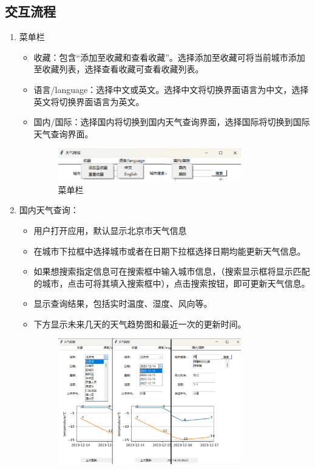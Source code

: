 \documentclass[UTF8]{ctexart}
\begin{document}
\subsection{交互流程}
\begin{enumerate}
   \item 菜单栏
   \begin{itemize}
      \item 收藏：包含“添加至收藏和查看收藏”。选择添加至收藏可将当前城市添加至收藏列表，选择查看收藏可查看收藏列表。
      \item 语言/language：选择中文或英文。选择中文将切换界面语言为中文，选择英文将切换界面语言为英文。
      \item 国内/国际：选择国内将切换到国内天气查询界面，选择国际将切换到国际天气查询界面。
      \begin{figure}[H]
         \centering
         \includegraphics[width=0.8\textwidth]{picb1.png}
         \caption{菜单栏}
      \end{figure}
   \end{itemize}
   \item 国内天气查询：
         \begin{itemize}
            \item 用户打开应用，默认显示北京市天气信息
            \item 在城市下拉框中选择城市或者在日期下拉框选择日期均能更新天气信息。
            \item 如果想搜索指定信息可在搜索框中输入城市信息，（搜索显示框将显示匹配的城市，点击可将其填入搜索框中），点击搜索按钮，即可更新天气信息。
            \item 显示查询结果，包括实时温度、湿度、风向等。
            \item 下方显示未来几天的天气趋势图和最近一次的更新时间。
            \begin{figure}[H]
               \centering
               \includegraphics[width=0.8\textwidth]{picb2.png}

\end{figure}
\end{itemize}
\end{enumerate}
\end{document}

